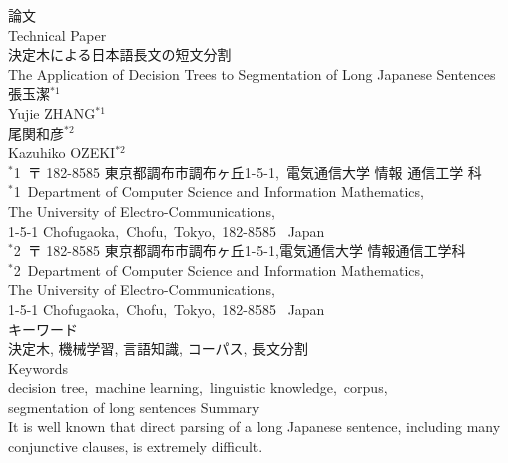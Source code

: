 \setlength{\oddsidemargin}{20pt}
\setlength{\evensidemargin}{20pt}
\setlength{\textwidth}{140mm}
\setlength{\topmargin}{20pt}
\setlength{\textheight}{220mm}
\setlength{\columnsep}{8mm}
\pagestyle{plain} 

\baselineskip 7mm
\noindent
論文\\
Technical Paper\\
決定木による日本語長文の短文分割\\
The Application of Decision Trees to  Segmentation of Long
Japanese Sentences \\
張玉潔${}^{*1}$\\
Yujie ZHANG${}^{*1}$\\
尾関和彦${}^{*2}$\\
Kazuhiko OZEKI${}^{*2}$\\
${}^{*}$1\ 〒 182-8585  東京都調布市調布ヶ丘1-5-1,\ 電気通信大学  情報
通信工学
科\\
${}^{*}$1\ Department of Computer Science and Information
Mathematics,\\ 
\hspace*{4mm} The University of Electro-Communications,\\
\hspace*{4mm} 1-5-1 Chofugaoka,\ Chofu,\ Tokyo,\ 182-8585 \
Japan\\
${}^{*}$2\ 〒 182-8585  東京都調布市調布ヶ丘1-5-1,電気通信大学  情報通信工学科
\\
${}^{*}$2\ Department of Computer Science and Information
Mathematics,\\
\hspace*{4mm} The University of Electro-Communications,\\
\hspace*{4mm} 1-5-1 Chofugaoka,\ Chofu,\ Tokyo,\ 182-8585 \
Japan\\
{\sf キーワード}\\
\hspace*{4mm}決定木, 機械学習, 言語知識, コーパス, 長文分割\\
{\sf Keywords}\\
\hspace*{4mm}decision tree,\ machine learning,\
linguistic knowledge,\ corpus,\\
\hspace*{3mm} segmentation of long sentences
\newpage
\noindent
Summary\\
It is well known that direct parsing of
a long Japanese sentence, including many conjunctive clauses,
is extremely difficult.
